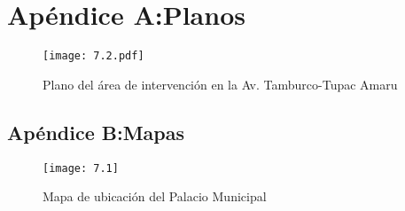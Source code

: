 \chapter{Apéndice A:Planos}
\begin{figure}[H]
	\centering
	\texttt{[image: 7.2.pdf]}
	\caption{Plano del área de intervención en la Av. Tamburco-Tupac Amaru}
	\label{fig:7.2}
\end{figure}
\newpage
\begin{landscape}
	
\end{landscape}


    \begin{landscape}
        \chapter{Apéndice B:Mapas}
    \begin{figure}[htb]
        \centering
        \texttt{[image: 7.1]}
        \caption{Mapa de ubicación del Palacio Municipal}
        \label{fig:7.1}
    \end{figure}
    \end{landscape}   
\restoregeometry %
